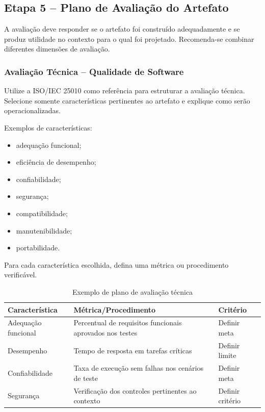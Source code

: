 \documentclass[12pt]{article}
\begin{document}
\subsection{Etapa 5 -- Plano de Avaliação do Artefato}

A avaliação deve responder se o artefato foi construído adequadamente e se produz utilidade no contexto para o qual foi projetado. Recomenda-se combinar diferentes dimensões de avaliação.

\subsubsection{Avaliação Técnica -- Qualidade de Software}

Utilize a ISO/IEC 25010 como referência para estruturar a avaliação técnica. Selecione somente características pertinentes ao artefato e explique como serão operacionalizadas.

Exemplos de características:
\begin{itemize}[noitemsep]
    \item adequação funcional;
    \item eficiência de desempenho;
    \item confiabilidade;
    \item segurança;
    \item compatibilidade;
    \item manutenibilidade;
    \item portabilidade.
\end{itemize}

Para cada característica escolhida, defina uma métrica ou procedimento verificável.

\begin{table}[!ht]
\centering
\caption{Exemplo de plano de avaliação técnica}
\label{tab:avaliacao_tecnica}
\begin{tabular}{p{3.0cm}p{5.0cm}p{3.0cm}}
\toprule
\textbf{Característica} & \textbf{Métrica/Procedimento} & \textbf{Critério} \\
\midrule
Adequação funcional & Percentual de requisitos funcionais aprovados nos testes & Definir meta \\
Desempenho & Tempo de resposta em tarefas críticas & Definir limite \\
Confiabilidade & Taxa de execução sem falhas nos cenários de teste & Definir meta \\
Segurança & Verificação dos controles pertinentes ao contexto & Definir critério \\
\bottomrule
\end{tabular}
\end{table}
\end{document}
